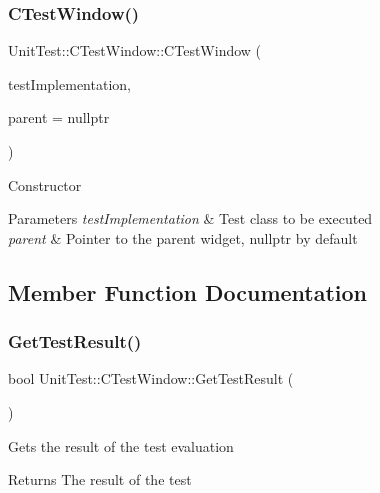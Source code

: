 \subsubsection{\texorpdfstring{CTestWindow()}{CTestWindow()}}
{\footnotesize\ttfamily Unit\+Test\+::\+C\+Test\+Window\+::\+C\+Test\+Window (\begin{DoxyParamCaption}\item[{const \mbox{\hyperlink{class_unit_test_1_1_c_base_geometry_test}{C\+Base\+Geometry\+Test}} \&}]{test\+Implementation,  }\item[{Q\+Widget $\ast$}]{parent = {\ttfamily nullptr} }\end{DoxyParamCaption})\hspace{0.3cm}{\ttfamily [explicit]}}

Constructor 
\begin{DoxyParams}{Parameters}
{\em test\+Implementation} & Test class to be executed \\
\hline
{\em parent} & Pointer to the parent widget, nullptr by default \\
\hline
\end{DoxyParams}


\subsection{Member Function Documentation}
\mbox{\label{class_unit_test_1_1_c_test_window_a807ee479a1a6b5457482ff2b7b2c2af9}} 
\subsubsection{\texorpdfstring{GetTestResult()}{GetTestResult()}}
{\footnotesize\ttfamily bool Unit\+Test\+::\+C\+Test\+Window\+::\+Get\+Test\+Result (\begin{DoxyParamCaption}{ }\end{DoxyParamCaption})\hspace{0.3cm}{\ttfamily [inline]}}

Gets the result of the test evaluation \begin{DoxyReturn}{Returns}
The result of the test 
\end{DoxyReturn}
\mbox{\label{class_unit_test_1_1_c_test_window_a2d6a01f4ad96cb0396797a7f2313a7b4}} 
